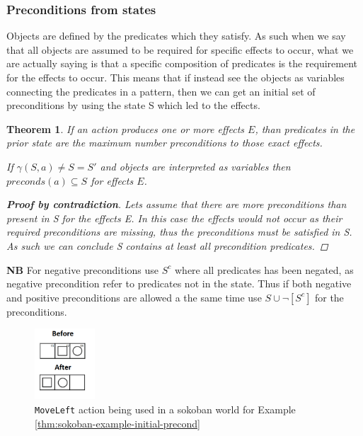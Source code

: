 \documentclass[../Master.tex]{subfiles}
\begin{document}
\subsubsection{Preconditions from states}
Objects are defined by the predicates which they satisfy. As such when we say that all objects are assumed to be required for specific effects to occur, what we are actually saying is that a specific composition of predicates is the requirement for the effects to occur.
This means that if instead see the objects as variables connecting the predicates in a pattern, then we can get an initial set of preconditions by using the state S which led to the effects.

\newtheorem{thm-precondition-state}{Theorem}
\begin{thm-precondition-state}\label{thm:precondition-state}
If an action produces one or more effects $E$, than predicates in the prior state are the maximum number preconditions to those exact effects.	

	If $\gamma (S,a) \neq S = S'$ and objects are interpreted as variables then $preconds(a) \subseteq S$  for effects $E$.
\begin{proof}[\textbf{Proof by contradiction}] Lets assume that there are more preconditions than present in S for the effects E.
	In this case the effects would not occur as their required preconditions are missing, thus the preconditions must be satisfied in S. 
	As such we can conclude S contains at least all precondition predicates.    \qedhere
\end{proof}
\end{thm-precondition-state}

\textbf{NB} For negative preconditions use $S^c$ where all predicates has been negated, as negative precondition refer to predicates not in the state. 
Thus if both negative and positive preconditions are allowed a the same time use  $S \cup \neg[S^c] $ for the preconditions.  

\begin{figure}
	\centering
	\includegraphics[width=0.2\textwidth]{../Graphics/soko_cond_example.png}
	
	\caption{\label{fig:soko-conditional}\texttt{MoveLeft} action being used in a sokoban world for Example \ref{thm:sokoban-example-initial-precond} }	
	
\end{figure}
\end{document}
